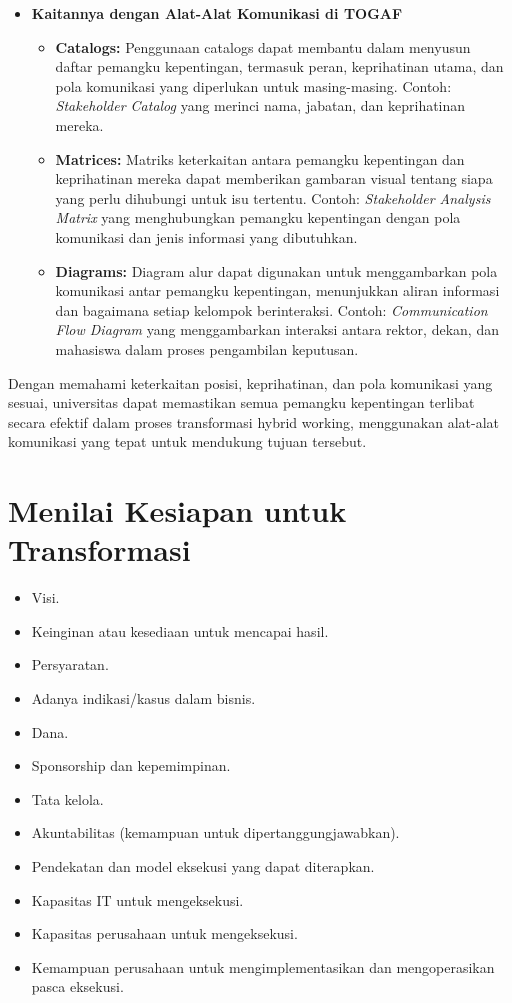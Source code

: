 \begin{itemize}
	\item \textbf{Kaitannya dengan Alat-Alat Komunikasi di TOGAF}
	\begin{itemize}
		\item \textbf{Catalogs:} Penggunaan catalogs dapat membantu dalam menyusun daftar pemangku kepentingan, termasuk peran, keprihatinan utama, dan pola komunikasi yang diperlukan untuk masing-masing. Contoh: \textit{Stakeholder Catalog} yang merinci nama, jabatan, dan keprihatinan mereka.
		\item \textbf{Matrices:} Matriks keterkaitan antara pemangku kepentingan dan keprihatinan mereka dapat memberikan gambaran visual tentang siapa yang perlu dihubungi untuk isu tertentu. Contoh: \textit{Stakeholder Analysis Matrix} yang menghubungkan pemangku kepentingan dengan pola komunikasi dan jenis informasi yang dibutuhkan.
		\item \textbf{Diagrams:} Diagram alur dapat digunakan untuk menggambarkan pola komunikasi antar pemangku kepentingan, menunjukkan aliran informasi dan bagaimana setiap kelompok berinteraksi. Contoh: \textit{Communication Flow Diagram} yang menggambarkan interaksi antara rektor, dekan, dan mahasiswa dalam proses pengambilan keputusan.
	\end{itemize}
\end{itemize}

Dengan memahami keterkaitan posisi, keprihatinan, dan pola komunikasi yang sesuai, universitas dapat memastikan semua pemangku kepentingan terlibat secara efektif dalam proses transformasi hybrid working, menggunakan alat-alat komunikasi yang tepat untuk mendukung tujuan tersebut.


\section{Menilai Kesiapan untuk Transformasi}
\label{sec:kesiapan_transformasi}
\begin{itemize}
	\item Visi.
	\item Keinginan atau kesediaan untuk mencapai hasil.
	\item Persyaratan.
	\item Adanya indikasi/kasus dalam bisnis.
	\item Dana.
	\item Sponsorship dan kepemimpinan.
	\item Tata kelola.
	\item Akuntabilitas (kemampuan untuk dipertanggungjawabkan).
	\item Pendekatan dan model eksekusi yang dapat diterapkan.
	\item Kapasitas IT untuk mengeksekusi.
	\item Kapasitas perusahaan untuk mengeksekusi.
	\item Kemampuan perusahaan untuk mengimplementasikan dan mengoperasikan pasca eksekusi.
\end{itemize}

